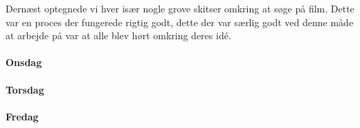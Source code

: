 \documentclass{article}
\begin{document}
Dernæst optegnede vi hver især nogle grove skitser omkring at søge på film.
Dette var en proces der fungerede rigtig godt, dette der var særlig godt ved
denne måde at arbejde på var at alle blev hørt omkring deres idé.

\paragraph{Onsdag}

\paragraph{Torsdag}


\paragraph{Fredag}


\end{document}
